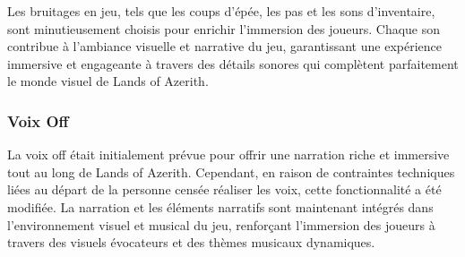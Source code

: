 Les bruitages en jeu, tels que les coups d'épée, les pas et les sons d'inventaire, sont minutieusement choisis pour enrichir l'immersion des joueurs.
Chaque son contribue à l'ambiance visuelle et narrative du jeu, garantissant une expérience immersive et engageante à travers des détails sonores qui complètent parfaitement le monde visuel de Lands of Azerith.

\subsubsection{Voix Off}

La voix off était initialement prévue pour offrir une narration riche et immersive tout au long de Lands of Azerith.
Cependant, en raison de contraintes techniques liées au départ de la personne censée réaliser les voix, cette fonctionnalité a été modifiée.
La narration et les éléments narratifs sont maintenant intégrés dans l'environnement visuel et musical du jeu, renforçant l'immersion des joueurs à travers des visuels évocateurs et des thèmes musicaux dynamiques.
